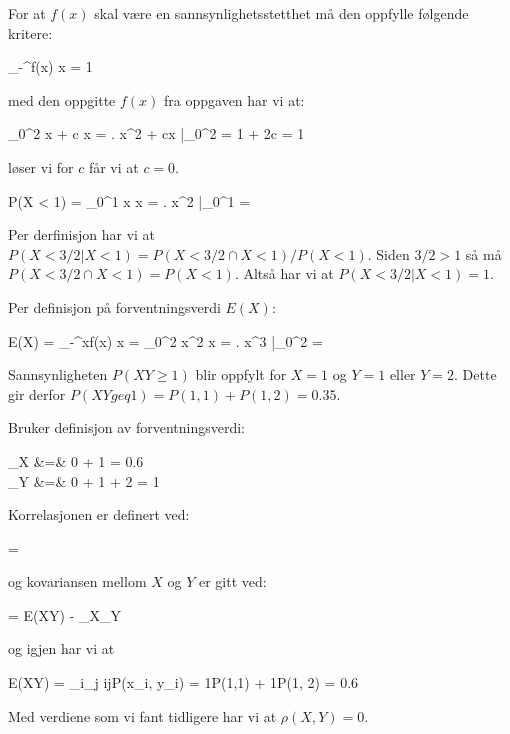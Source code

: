 \statistikk
\oppgave
\deloppgave
For at $f(x)$ skal være en sannsynlighetsstetthet må den oppfylle følgende kritere:
\begin{likning}
	\int_{-\infty}^\infty f(x) \dd x = 1
\end{likning}
med den oppgitte $f(x)$ fra oppgaven har vi at:
\begin{likning}
	\int_{0}^2 x + c \dd x = \left. x^2 + cx \right|_0^2 = 1 + 2c = 1
\end{likning}
løser vi for $c$ får vi at $c = 0$.

\deloppgave
\begin{utregning}
	P(X < 1) = \int_0^1 x \dd x = \left. x^2 \right|_0^1 = 
\end{utregning}

\deloppgave
Per derfinisjon har vi at $P(X < 3/2 | X < 1) = P(X < 3/2 \cap X < 1)/P(X < 1)$. Siden $3/2 > 1$ så må $P(X < 3/2 \cap X < 1) = P(X < 1)$. Altså har vi at $P(X < 3/2 | X < 1) = 1$.

\deloppgave
Per definisjon på forventningsverdi $E(X)$:
\begin{likning}
	E(X) = \int_{-\infty}^\infty xf(x) \dd x = \int_0^2 x^2 \dd x = \left. x^3 \right|_0^2 = 
\end{likning}

\oppgave
\deloppgave
Sannsynligheten $P(XY \geq 1)$ blir oppfylt for $X = 1$ og $Y = 1$ eller $Y = 2$. Dette gir derfor $P(XY geq 1) = P(1, 1) + P(1, 2) = 0.35$.

\deloppgave
Bruker definisjon av forventningsverdi:
\begin{utregning}
	\mu_X &=& 0 + 1 = 0.6\\
	\mu_Y &=& 0 + 1 + 2 = 1
\end{utregning}

\deloppgave
Korrelasjonen er definert ved:
\begin{likning}
	 = 
\end{likning}
og kovariansen mellom $X$ og $Y$ er gitt ved:
\begin{likning}
	 = E(XY) - \mu_X\mu_Y
\end{likning}
og igjen har vi at
\begin{likning}
	E(XY) = \sum_i\sum_j ijP(x_i, y_i) = 1\cdot P(1,1) + 1\cdot P(1, 2) = 0.6
\end{likning}
Med verdiene som vi fant tidligere har vi at $\rho(X, Y) = 0$.

